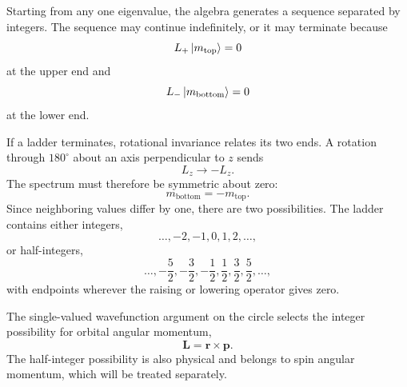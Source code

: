 Starting from any one eigenvalue, the algebra generates a sequence separated by integers. The sequence may continue indefinitely, or it may terminate because
\begin{equation}
L_+\left\lvert m_{\mathrm{top}}\right\rangle=0
\end{equation}
at the upper end and
\begin{equation}
L_-\left\lvert m_{\mathrm{bottom}}\right\rangle=0
\end{equation}
at the lower end.

\begin{classroomqa}
\end{classroomqa}

If a ladder terminates, rotational invariance relates its two ends. A rotation through \(180^\circ\) about an axis perpendicular to \(z\) sends
\begin{equation}
L_z\longrightarrow-L_z.
\end{equation}
The spectrum must therefore be symmetric about zero:
\begin{equation}
m_{\mathrm{bottom}}=-m_{\mathrm{top}}.
\end{equation}
Since neighboring values differ by one, there are two possibilities. The ladder contains either integers,
\begin{equation}
\ldots,-2,-1,0,1,2,\ldots,
\end{equation}
or half-integers,
\begin{equation}
\ldots,-\frac{5}{2},-\frac{3}{2},-\frac{1}{2},
\frac{1}{2},\frac{3}{2},\frac{5}{2},\ldots,
\end{equation}
with endpoints wherever the raising or lowering operator gives zero.

The single-valued wavefunction argument on the circle selects the integer possibility for orbital angular momentum,
\begin{equation}
\mathbf L=\mathbf r\times\mathbf p.
\end{equation}
The half-integer possibility is also physical and belongs to spin angular momentum, which will be treated separately.

